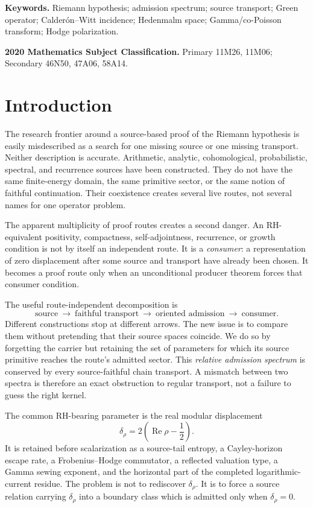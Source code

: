 \documentclass[11pt]{article}
\theoremstyle{definition}
\theoremstyle{remark}
\newcommand{\Rea}{\operatorname{Re}}
\begin{document}
\medskip
\noindent\textbf{Keywords.}
Riemann hypothesis; admission spectrum; source transport; Green operator;
Calder\'on--Witt incidence; Hedenmalm space; Gamma/co-Poisson transform;
Hodge polarization.

\medskip
\noindent\textbf{2020 Mathematics Subject Classification.}
Primary 11M26, 11M06; Secondary 46N50, 47A06, 58A14.

\section{Introduction}

The research frontier around a source-based proof of the Riemann
hypothesis is easily misdescribed as a search for one missing source or
one missing transport.  Neither description is accurate.  Arithmetic,
analytic, cohomological, probabilistic, spectral, and recurrence sources
have been constructed.  They do not have the same finite-energy domain,
the same primitive sector, or the same notion of faithful continuation.
Their coexistence creates several live routes, not several names for one
operator problem.

The apparent multiplicity of proof routes creates a second danger.  An
RH-equivalent positivity, compactness, self-adjointness, recurrence, or
growth condition is not by itself an independent route.  It is a
\emph{consumer}: a representation of zero displacement after some source
and transport have already been chosen.  It becomes a proof route only
when an unconditional producer theorem forces that consumer condition.

The useful route-independent decomposition is
\[
 \boxed{
 \text{source}\ \longrightarrow\
 \text{faithful transport}\ \longrightarrow\
 \text{oriented admission}\ \longrightarrow\
 \text{consumer}.}
\tag{1.1}\label{eq:four-stage}
\]
Different constructions stop at different arrows.  The new issue is to
compare them without pretending that their source spaces coincide.  We do
so by forgetting the carrier but retaining the set of parameters for which
its source primitive reaches the route's admitted sector.  This
\emph{relative admission spectrum} is conserved by every source-faithful
chain transport.  A mismatch between two spectra is therefore an exact
obstruction to regular transport, not a failure to guess the right kernel.

The common RH-bearing parameter is the real modular displacement
\[
                    \delta_\rho
                    =2\left(\Rea\rho-\frac12\right).
\tag{1.2}\label{eq:delta}
\]
It is retained before scalarization as a source-tail entropy, a
Cayley-horizon escape rate, a Frobenius--Hodge commutator, a reflected
valuation type, a Gamma sewing exponent, and the horizontal part of the
completed logarithmic-current residue.  The problem is not to rediscover
\(\delta_\rho\).  It is to force a source relation carrying
\(\delta_\rho\) into a boundary class which is admitted only when
\(\delta_\rho=0\).
\end{document}

